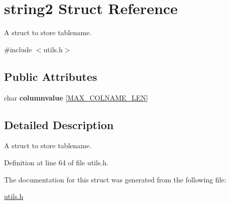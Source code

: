 \hypertarget{structstring2}{\section{string2 Struct Reference}
\label{structstring2}
}


A struct to store tablename.  




{\ttfamily \#include $<$utils.\-h$>$}

\subsection*{Public Attributes}
\begin{DoxyCompactItemize}
\item 
\hypertarget{structstring2_a2f37ca9b19fdfbd767923615bb290085}{char {\bfseries columnvalue} \mbox{[}\hyperlink{storage_8h_a5cced553ee7679aebe25952d79c7b86b}{M\-A\-X\-\_\-\-C\-O\-L\-N\-A\-M\-E\-\_\-\-L\-E\-N}\mbox{]}}\label{structstring2_a2f37ca9b19fdfbd767923615bb290085}

\end{DoxyCompactItemize}


\subsection{Detailed Description}
A struct to store tablename. 

Definition at line 64 of file utils.\-h.



The documentation for this struct was generated from the following file\-:\begin{DoxyCompactItemize}
\item 
\hyperlink{utils_8h}{utils.\-h}\end{DoxyCompactItemize}
